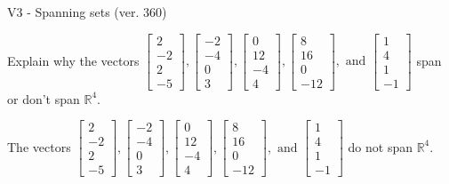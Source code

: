 \begin{exercise}
  \begin{exerciseTitle}V3 - Spanning sets (ver. 360)\end{exerciseTitle}
  \begin{exerciseStatement}
    Explain why the vectors \(\left[\begin{array}{r}
2 \\
-2 \\
2 \\
-5
\end{array}\right] , \left[\begin{array}{r}
-2 \\
-4 \\
0 \\
3
\end{array}\right] , \left[\begin{array}{r}
0 \\
12 \\
-4 \\
4
\end{array}\right] , \left[\begin{array}{r}
8 \\
16 \\
0 \\
-12
\end{array}\right] , \text{ and } \left[\begin{array}{r}
1 \\
4 \\
1 \\
-1
\end{array}\right]\) span or don't span \(\mathbb{R}^4\). 
	


  \end{exerciseStatement}
  \begin{exerciseAnswer}
   The vectors \(\left[\begin{array}{r}
2 \\
-2 \\
2 \\
-5
\end{array}\right] , \left[\begin{array}{r}
-2 \\
-4 \\
0 \\
3
\end{array}\right] , \left[\begin{array}{r}
0 \\
12 \\
-4 \\
4
\end{array}\right] , \left[\begin{array}{r}
8 \\
16 \\
0 \\
-12
\end{array}\right] , \text{ and } \left[\begin{array}{r}
1 \\
4 \\
1 \\
-1
\end{array}\right]\) 
  	 do not  
	span \(\mathbb{R}^4\).
  



\end{exerciseAnswer}
\end{exercise}
